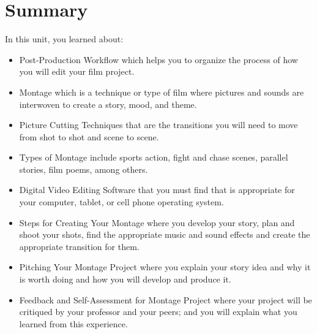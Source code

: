 \documentclass[
  letterpaper,
  DIV=11,
  numbers=noendperiod]{scrreprt}
\providecommand{\tightlist}{%
  \setlength{\itemsep}{0pt}\setlength{\parskip}{0pt}}\usepackage{longtable,booktabs,array}
\begin{document}
\section*{Summary}\label{summary-6}


In this unit, you learned about:

\begin{itemize}
\tightlist
\item
  Post-Production Workflow which helps you to organize the process of
  how you will edit your film project.
\item
  Montage which is a technique or type of film where pictures and sounds
  are interwoven to create a story, mood, and theme.
\item
  Picture Cutting Techniques that are the transitions you will need to
  move from shot to shot and scene to scene.
\item
  Types of Montage include sports action, fight and chase scenes,
  parallel stories, film poems, among others.
\item
  Digital Video Editing Software that you must find that is appropriate
  for your computer, tablet, or cell phone operating system.
\item
  Steps for Creating Your Montage where you develop your story, plan and
  shoot your shots, find the appropriate music and sound effects and
  create the appropriate transition for them.
\item
  Pitching Your Montage Project where you explain your story idea and
  why it is worth doing and how you will develop and produce it.
\item
  Feedback and Self-Assessment for Montage Project where your project
  will be critiqued by your professor and your peers; and you will
  explain what you learned from this experience.
\end{itemize}
\end{document}

